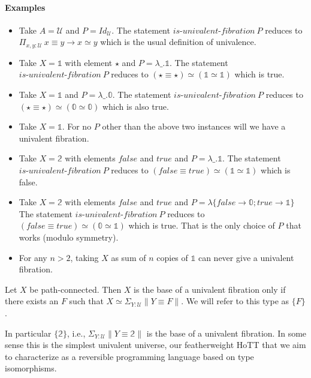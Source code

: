 \documentclass[format=acmlarge,review,natbib]{acmart}
\newcommand{\zt}{\mathbb{0}}
\newcommand{\ot}{\mathbb{1}}
\newcommand{\bt}{\mathbb{2}}
\newcommand{\fc}{\mathit{false}}
\newcommand{\tc}{\mathit{true}}
\begin{document}
\noindent\paragraph*{Examples}
\begin{itemize}
\item Take $A = \mathcal{U}$ and $P = \mathit{Id}_{\mathcal{U}}$. The statement
  $\textit{is-univalent-fibration}~P$ reduces to $\Pi_{x,y:\mathcal{U}}~x \equiv y \to
  x \simeq y$ which is the usual definition of univalence.

\newpage

\item Take $X = \ot$ with element $\star$ and $P = \lambda \_. \ot$. The
  statement $\textit{is-univalent-fibration}~P$ reduces to
  $(\star\equiv\star)\simeq(\ot\simeq\ot)$ which is true.
\item Take $X = \ot$ and $P = \lambda \_. \zt$. The statement
  $\textit{is-univalent-fibration}~P$ reduces to
  $(\star\equiv\star)\simeq(\zt\simeq\zt)$ which is also true.
\item Take $X = \ot$. For no $P$ other than the above two instances will
  we have a univalent fibration.
\item Take $X = \bt$ with elements $\fc$ and $\tc$ and
  $P = \lambda \_. \ot$. The statement
  $\textit{is-univalent-fibration}~P$ reduces to $(\fc \equiv \tc) \simeq
  (\ot\simeq\ot)$ which is false.
\item Take $X = \bt$ with elements $\fc$ and $\tc$ and
  $P = \lambda \{ \fc \to \zt; \tc \to \ot \}$ The statement
  $\textit{is-univalent-fibration}~P$ reduces to $(\fc \equiv \tc) \simeq
  (\zt\simeq\ot)$ which is true. That is the only choice of $P$
  that works (modulo symmetry).
\item For any $n > 2$, taking $X$ as sum of $n$ copies of $\ot$ can never
  give a univalent fibration.
\end{itemize}

\begin{theorem}
  Let $X$ be path-connected. Then $X$ is the base of a univalent fibration only
  if there exists an $F$ such that $X \simeq \Sigma_{Y : \mathcal{U}} \| Y \equiv F
  \|$. We will refer to this type as $\{F\}$.
\end{theorem}

\noindent In particular $\{\bt\}$, i.e.,
$\Sigma_{Y : \mathcal{U}} \| Y \equiv \bt \|$ is the base of a univalent
fibration. In some sense this is the simplest univalent universe, our
featherweight HoTT that we aim to characterize as a reversible programming
language based on type isomorphisms.
\end{document}
